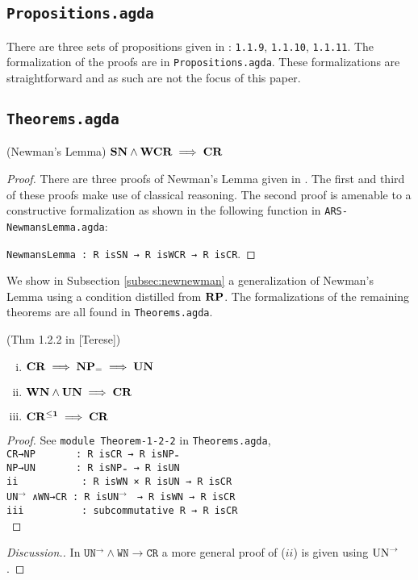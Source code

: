 \subsection{\texttt{Propositions.agda}}
There are three sets of propositions given in \terese: \texttt{1.1.9}, \texttt{1.1.10}, \texttt{1.1.11}.
The formalization of the proofs are in \texttt{Propositions.agda}. These formalizations are straightforward
and as such are not the focus of this paper.

\subsection{\texttt{Theorems.agda}} \label{subsec:theorems}

\begin{theorem}(Newman's Lemma)
  $\mathbf{SN} \land \mathbf{WCR} \implies \mathbf{CR}$
\end{theorem}

\begin{proof}
  There are three proofs of Newman's Lemma given in \terese.
  The first and third of these proofs make use of classical reasoning. The second proof is amenable to a
  constructive formalization as shown in the following function in \texttt{ARS-NewmansLemma.agda}:

  \verb|NewmansLemma : R isSN → R isWCR → R isCR|.
\end{proof}

  We show in Subsection \ref{subsec:newnewman} a generalization of Newman's Lemma using a condition distilled from $\mathbf{RP}$.
  The formalizations of the remaining theorems are all found in \texttt{Theorems.agda}.

\begin{theorem}(Thm 1.2.2 in [Terese])
\begin{enumerate}[(i)]
  \item $\mathbf{CR} \implies \mathbf{NP_=} \implies \mathbf{UN}$
  \item $\mathbf{WN} \land \mathbf{UN} \implies \mathbf{CR}$
  \item $\mathbf{CR^{\le 1}} \implies \mathbf{CR}$
\end{enumerate}
\end{theorem}

\begin{proof}
    See \texttt{module Theorem-1-2-2} in \texttt{Theorems.agda}, \\
    \verb|CR→NP       : R isCR → R isNP₌|\\
    \verb|NP→UN       : R isNP₌ → R isUN|\\
    \verb|ii           : R isWN × R isUN → R isCR|\\
    \verb||\texttt{UN}$^{\to}$$\,$ \verb|∧WN→CR : R |\texttt{isUN}$^{\to}$ \verb| → R isWN → R isCR|\\
    \verb|iii          : subcommutative R → R isCR|\\
\end{proof}
\begin{proof}[Discussion.]
    In $\mathtt{UN^{→}∧WN→CR}$ a more general proof of ($ii$) is given using $\mathrm{UN}^{\to}$.
\end{proof}

